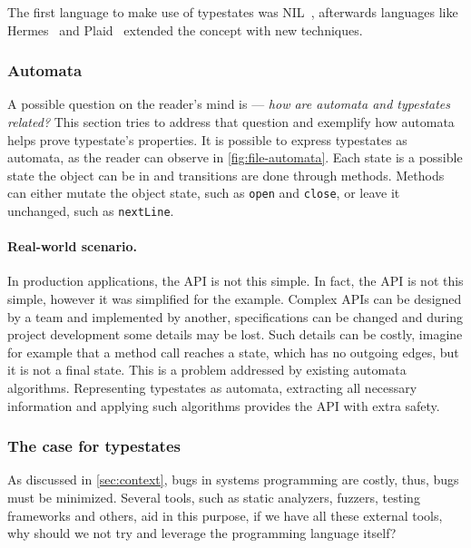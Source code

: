 The first language to make use of typestates was NIL~\autocite{Strom1983},
afterwards languages like Hermes~\autocite{Strom1990} and Plaid~\autocite{Aldrich2009}
extended the concept with new techniques.

\subsubsection*{Automata}

A possible question on the reader's mind is --- \emph{how are automata and typestates related?}
This section tries to address that question and exemplify how automata helps prove typestate's properties.
It is possible to express typestates as automata, as the reader can observe in \autoref{fig:file-automata}.
Each state is a possible state the object can be in and transitions are done through methods.
Methods can either mutate the object state, such as \texttt{open} and \texttt{close},
or leave it unchanged, such as \texttt{nextLine}.



\paragraph{Real-world scenario.}
In production applications, the \gls{API} is not this simple.
In fact, the  \gls{API} is not this simple, however it was simplified for the example.
Complex \gls{API}s can be designed by a team and implemented by another,
specifications can be changed and during project development some details may be lost.
Such details can be costly, imagine for example that a method call reaches a state, which has no outgoing edges,
but it is not a final state. This is a problem addressed by existing automata algorithms.
Representing typestates as automata, extracting all necessary information and applying such algorithms provides the \gls{API} with extra safety.

\subsubsection*{The case for typestates}

As discussed in \autoref{sec:context}, bugs in systems programming are costly,
thus, bugs must be minimized.
Several tools, such as static analyzers, fuzzers, testing frameworks and others,
aid in this purpose, if we have all these external tools,
why should we not try and leverage the programming language itself?

